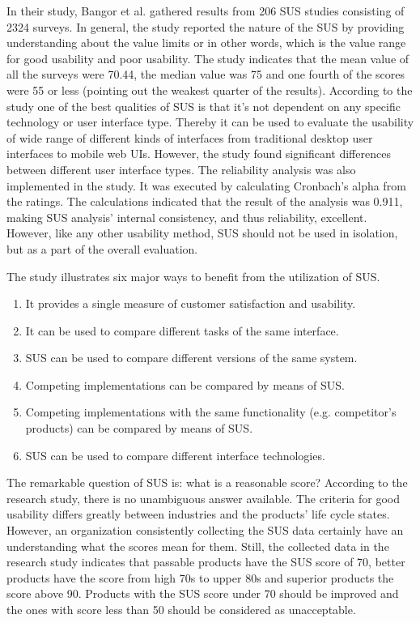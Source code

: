 \documentclass[12pt,a4paper,oneside,pdftex]{report}
\begin{document}
In their study, Bangor et al. gathered results from 206 SUS studies consisting of 2324 surveys. In general, the study reported the nature of the SUS by providing understanding about the value limits or in other words, which is the value range for good usability and poor usability. The study indicates that the mean value of all the surveys were 70.44, the median value was 75 and one fourth of the scores were 55 or less (pointing out the weakest quarter of the results). According to the study one of the best qualities of SUS is that it's not dependent on any specific technology or user interface type. Thereby it can be used to evaluate the usability of wide range of different kinds of interfaces from traditional desktop user interfaces to mobile web UIs. However, the study found significant differences between different user interface types. The reliability analysis was also implemented in the study. It was executed by calculating Cronbach's alpha from the ratings. The calculations indicated that the result of the analysis was 0.911, making SUS analysis' internal consistency, and thus reliability, excellent. However, like any other usability method, SUS should not be used in isolation, but as a part of the overall evaluation. \cite{RefWorks:12}

The study illustrates six major ways to benefit from the utilization of SUS. \cite{RefWorks:12}
\begin{enumerate}
\item It provides a single measure of customer satisfaction and usability.
\item It can be used to compare different tasks of the same interface. 
\item SUS can be used to compare different versions of the same system.
\item Competing implementations can be compared by means of SUS.
\item Competing implementations with the same functionality (e.g. competitor's products) can be compared by means of SUS.
\item SUS can be used to compare different interface technologies.
\end{enumerate}

The remarkable question of SUS is: what is a reasonable score? According to the research study, there is no unambiguous answer available. The criteria for good usability differs greatly between industries and the products' life cycle states. However, an organization consistently collecting the SUS data certainly have an understanding what the scores mean for them. Still, the collected data in the research study indicates that passable products have the SUS score of 70, better products have the score from high 70s to upper 80s and superior products the score above 90. Products with the SUS score under 70 should be improved and the ones with score less than 50 should be considered as unacceptable. \cite{RefWorks:12}
\end{document}
